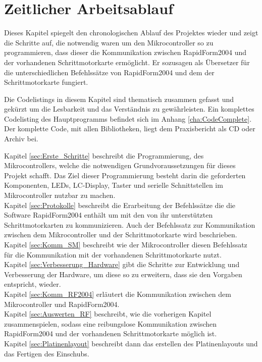 \chapter{Zeitlicher Arbeitsablauf}
\label{cha:Arbeit}
Dieses Kapitel spiegelt den chronologischen Ablauf des Projektes wieder und zeigt die Schritte auf, die notwendig waren um den Mikrocontroller so zu programmieren, dass dieser die Kommunikation zwischen RapidForm2004 und der vorhandenen Schrittmotorkarte ermöglicht. Er sozusagen als Übersetzer für die unterschiedlichen Befehlssätze von RapidForm2004 und dem der Schrittmotorkarte fungiert.
\begin{Tipp}Die Codelistings in diesem Kapitel sind thematisch zusammen gefasst und gekürzt um die Lesbarkeit und das Verständnis zu gewährleisten. Ein komplettes Codelisting des Hauptprogramms befindet sich im Anhang \ref{cha:CodeComplete}. Der komplette Code, mit allen Bibliotheken, liegt dem Praxisbericht als CD oder Archiv bei.\end{Tipp}
Kapitel \ref{sec:Erste_Schritte} beschreibt die Programmierung, des Mikrocontrollers, welche die notwendigen Grundvoraussetzungen für dieses Projekt schafft. Das Ziel dieser Programmierung besteht darin die geforderten Komponenten, LEDs, LC-Display, Taster und serielle Schnittstellen im Mikrocontroller nutzbar zu machen.\\
Kapitel \ref{sec:Protokolle} beschreibt die Erarbeitung der Befehlssätze die die Software RapidForm2004 enthält um mit den von ihr unterstützten Schrittmotorkarten zu kommunizieren. Auch der Befehlssatz zur Kommunikation zwischen dem Mikrocontroller und der Schrittmotorkarte wird beschrieben.\\
Kapitel \ref{sec:Komm_SM} beschreibt wie der Mikrocontroller diesen Befehlssatz für die Kommunikation mit der vorhandenen Schrittmotorkarte nutzt.\\
Kapitel \ref{sec:Verbesserung_Hardware} gibt die Schritte zur Entwicklung und Verbesserung der Hardware, um diese so zu erweitern, dass sie den Vorgaben entspricht, wieder.\\
Kapitel \ref{sec:Komm_RF2004} erläutert die Kommunikation zwischen dem Mikrocontroller und RapidForm2004. \\
Kapitel \ref{sec:Auswerten_RF} beschreibt, wie die vorherigen Kapitel zusammenspielen, sodass eine reibungslose Kommunikation zwischen RapidForm2004 und der vorhandenen Schrittmotorkarte möglich ist.\\
Kapitel \ref{sec:Platinenlayout} beschreibt dann das erstellen des Platinenlayouts und das Fertigen des Einschubs.

